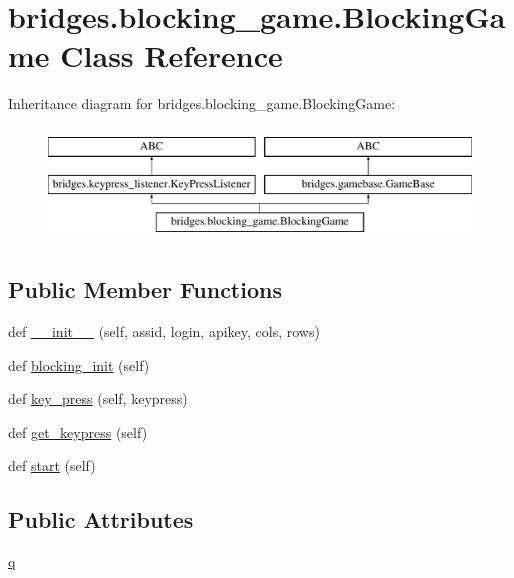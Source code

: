 \hypertarget{classbridges_1_1blocking__game_1_1_blocking_game}{}\section{bridges.\+blocking\+\_\+game.\+Blocking\+Game Class Reference}
\label{classbridges_1_1blocking__game_1_1_blocking_game}
Inheritance diagram for bridges.\+blocking\+\_\+game.\+Blocking\+Game\+:\begin{figure}[H]
\begin{center}
\leavevmode
\includegraphics[height=3.000000cm]{classbridges_1_1blocking__game_1_1_blocking_game}
\end{center}
\end{figure}
\subsection*{Public Member Functions}
\begin{DoxyCompactItemize}
\item 
def \mbox{\hyperlink{classbridges_1_1blocking__game_1_1_blocking_game_ae2575c068499e269e2279695d5f598b4}{\+\_\+\+\_\+init\+\_\+\+\_\+}} (self, assid, login, apikey, cols, rows)
\item 
def \mbox{\hyperlink{classbridges_1_1blocking__game_1_1_blocking_game_ab37e3832bd1220a060484419888f8072}{blocking\+\_\+init}} (self)
\item 
def \mbox{\hyperlink{classbridges_1_1blocking__game_1_1_blocking_game_aa8cda5f9304b87b66f6794a1b1f5a7db}{key\+\_\+press}} (self, keypress)
\item 
def \mbox{\hyperlink{classbridges_1_1blocking__game_1_1_blocking_game_a4dd145a1378d6f96112b8b73343e296a}{get\+\_\+keypress}} (self)
\item 
def \mbox{\hyperlink{classbridges_1_1blocking__game_1_1_blocking_game_ab7a2a5d6d83b2e72800ddffa3c0ad818}{start}} (self)
\end{DoxyCompactItemize}
\subsection*{Public Attributes}
\begin{DoxyCompactItemize}
\item 
\mbox{\hyperlink{classbridges_1_1blocking__game_1_1_blocking_game_a21d2b164100c6cd61a36f8704c69e51f}{q}}
\end{DoxyCompactItemize}
